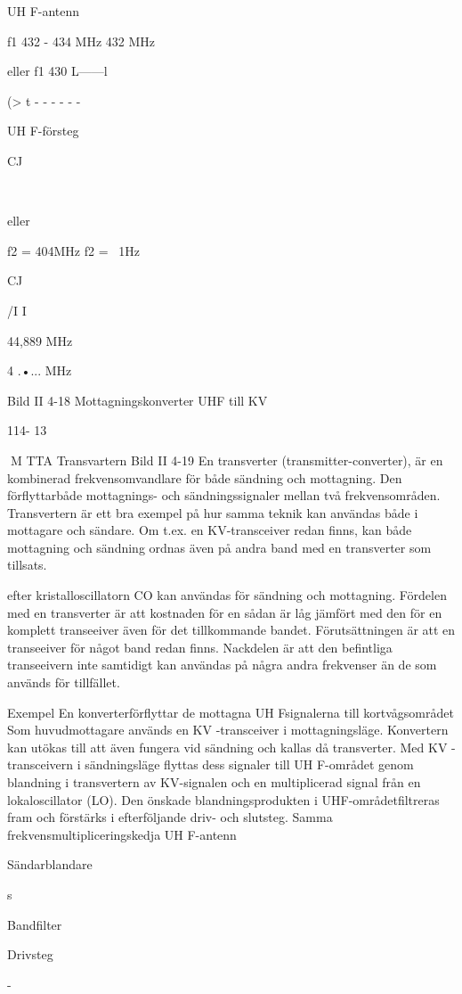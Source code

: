 \documentclass[a4paper,twoside,twocolumn,openright]{book}
\begin{document}
{{{UH F-antenn

f1 432 - 434 MHz
432 MHz

eller f1 430 L------l

(> t - - - - - -

UH F-försteg

CJ

~

eller

f2 = 404MHz
f2 =
~1Hz

CJ

/I I~

44,889 MHz

4 .•... MHz

Bild II 4-18 Mottagningskonverter UHF till KV

114- 13

M TTA
Transvartern
Bild II 4-19
En transverter (transmitter-converter), är
en kombinerad frekvensomvandlare för både
sändning och mottagning. Den förflyttarbåde
mottagnings- och sändningssignaler mellan två frekvensområden.
Transvertern är ett bra exempel på hur
samma teknik kan användas både i mottagare och sändare. Om t.ex. en KV-transceiver redan finns, kan både mottagning
och sändning ordnas även på andra band
med en transverter som tillsats.

efter kristalloscillatorn CO kan användas för
sändning och mottagning.
Fördelen med en transverter är att kostnaden för en sådan är låg jämfört med den
för en komplett transeeiver även för det
tillkommande bandet. Förutsättningen är att
en transeeiver för något band redan finns.
Nackdelen är att den befintliga transeeivern inte samtidigt kan användas på några
andra frekvenser än de som används för
tillfället.

Exempel
En konverterförflyttar de mottagna UH Fsignalerna till kortvågsområdet Som huvudmottagare används en KV -transceiver i
mottagningsläge. Konvertern kan utökas till
att även fungera vid sändning och kallas då
transverter. Med KV -transceivern i sändningsläge flyttas dess signaler till UH F-området genom blandning i transvertern av
KV-signalen och en multiplicerad signal från
en lokaloscillator (LO). Den önskade blandningsprodukten i UHF-områdetfiltreras fram
och förstärks i efterföljande driv- och slutsteg. Samma frekvensmultipliceringskedja
UH F-antenn

Sändarblandare

s

Bandfilter

Drivsteg

-

}}}
\end{document}
